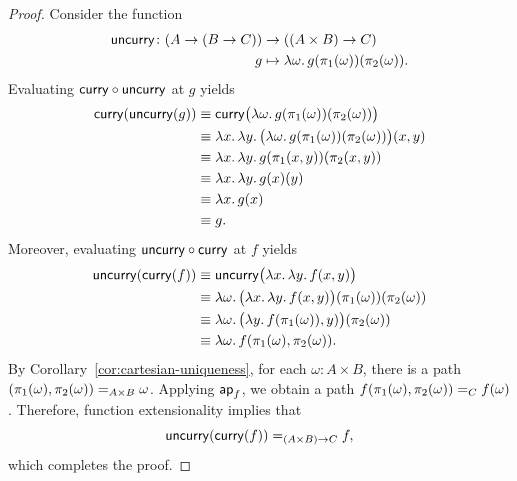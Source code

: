 \begin{proof}
    Consider the function
    \begin{align*}
        \fun{uncurry}\colon(A\to(B\to C))&\to((A\times B)\to C)\\
        g&\mapsto\lambda\omega.\,g(\pi_1(\omega))(\pi_2(\omega)).
    \end{align*}
    Evaluating $\mathsf{curry}\circ\mathsf{uncurry}$ at $g$ yields
    \begin{align*}
        \mathsf{curry}(\mathsf{uncurry}(g))
            &\equiv
                \mathsf{curry}
                    \bigl(
                        \lambda \omega.\,g(\pi_1(\omega))(\pi_2(\omega))
                    \bigr)\\
            &\equiv\lambda x.\,\lambda y.\,
                \bigl(
                    \lambda \omega.\,g(\pi_1(\omega))(\pi_2(\omega))
                \bigr)(x,y)\\
            &\equiv\lambda x.\,\lambda y.\,g(\pi_1(x,y))(\pi_2(x,y))\\
            &\equiv\lambda x.\,\lambda y.\,g(x)(y)\\
            &\equiv\lambda x.\,g(x)\\
            &\equiv g.
    \end{align*}
    Moreover, evaluating $\mathsf{uncurry}\circ\mathsf{curry}$ at $f$ yields
    \begin{align*}
        \mathsf{uncurry}(\mathsf{curry}(f))
            &\equiv
                \mathsf{uncurry}
                \bigl(
                    \lambda x.\,\lambda y.\,f(x,y)
                \bigr)\\
            &\equiv
                \lambda \omega.\,
                \bigl(
                    \lambda x.\,\lambda y.\,f(x,y)
                \bigr)
                    (\pi_1(\omega))(\pi_2(\omega))\\
            &\equiv
                \lambda\omega.\,
                \bigl(
                    \lambda y.\,f(\pi_1(\omega)),y)
                \bigr)(\pi_2(\omega))\\
            &\equiv\lambda\omega.\,f(\pi_1(\omega),\pi_2(\omega)).
    \end{align*}
    By Corollary~\ref{cor:cartesian-uniqueness}, for each $\omega\colon A\times B$, there is a path $(\pi_1(\omega),\pi_2(\omega))\mathrel{=_{A\times B}}\omega$. Applying $\mathsf{ap}_f$, we obtain a path $f(\pi_1(\omega),\pi_2(\omega))\mathrel{=_{C}}f(\omega)$. Therefore, function extensionality implies that
    \[
        \mathsf{uncurry}(\mathsf{curry}(f))\mathrel{=_{(A\times B)\to C}}f,
    \]
    which completes the proof.
\end{proof}

